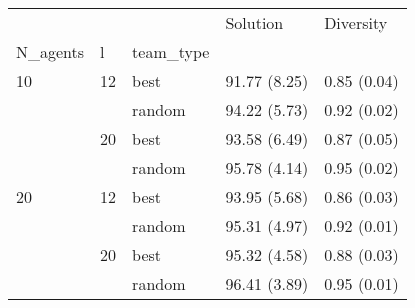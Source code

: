 \begin{tabular}{lllll}
\toprule
   &    &        &      Solution &    Diversity \\
N\_agents & l & team\_type &               &              \\
\midrule
10 & 12 & best &  91.77 (8.25) &  0.85 (0.04) \\
   &    & random &  94.22 (5.73) &  0.92 (0.02) \\
   & 20 & best &  93.58 (6.49) &  0.87 (0.05) \\
   &    & random &  95.78 (4.14) &  0.95 (0.02) \\
20 & 12 & best &  93.95 (5.68) &  0.86 (0.03) \\
   &    & random &  95.31 (4.97) &  0.92 (0.01) \\
   & 20 & best &  95.32 (4.58) &  0.88 (0.03) \\
   &    & random &  96.41 (3.89) &  0.95 (0.01) \\
\bottomrule
\end{tabular}
